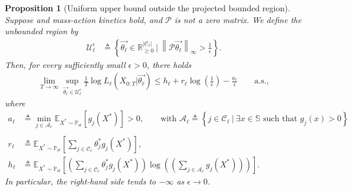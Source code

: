 \documentclass[pdflatex,sn-mathphys-num]{sn-jnl}%
\theoremstyle{thmstyleone}%
\newtheorem{proposition}[theorem]{Proposition}%
\theoremstyle{thmstyletwo}%
\theoremstyle{thmstylethree}%
\begin{document}
\begin{appendices}
\begin{proposition}[Uniform upper bound outside the projected bounded region]\label{proposition uniform upper bound outside bounded region}
    Suppose  and mass-action kinetics hold, and $\mathcal P$ is not a zero matrix.
    We define the unbounded region by
    \begin{align*}
        \mathcal U_\ell^\epsilon
        &\triangleq
        \left\{\overrightarrow{\theta_\ell}
        \in\mathbb R_{\geq0}^{|\mathcal C_\ell|}~\Big|~
        \left\|\mathcal P\overrightarrow{\theta_\ell}\right\|_\infty
        >\frac{1}{\epsilon}
        \right\}.
    \end{align*}
    Then, for every sufficiently small $\epsilon>0$, there holds
    \begin{align}\label{eq upper bound outside bounded region}
        \lim_{T\to\infty}
        \sup_{\overrightarrow{\theta_\ell}\in\mathcal U_\ell^\epsilon}
        \frac{1}{T}\log L_\ell\left(X_{0:T}\big|\overrightarrow{\theta_\ell}\right)
        \leq
        h_\ell
        + r_\ell\log\left(\frac{1}{\epsilon}\right)
        -\frac{a_\ell}{\epsilon}
        \qquad \text{a.s.},
    \end{align}
    where
    \begin{align*}
        a_\ell
        &\triangleq
        \min_{j\in\mathcal A_\ell}
        \mathbb E_{X^*\sim\mathbb P_\text{st}}\left[g_j(X^*)\right] >0,
        \qquad \text{with $\mathcal A_\ell
        \triangleq
        \left\{j\in\mathcal C_\ell~\Big|~
        \exists x\in\mathbb S \text{ such that } g_j(x)>0
        \right\}$} \\
        \\
        r_\ell
        &\triangleq
        \mathbb E_{X^*\sim\mathbb P_\text{st}}\left[
        \sum_{j\in\mathcal C_\ell}\theta_j^*g_j(X^*)
        \right],\\
        h_\ell
        &\triangleq
        \mathbb E_{X^*\sim\mathbb P_\text{st}}\left[
        \left(\sum_{j\in\mathcal C_\ell}\theta_j^*g_j(X^*)\right)
        \log\left(\left(\sum_{j\in\mathcal A_\ell}g_j(X^*)\right)\right)
        \right].
    \end{align*}
    In particular, the right-hand side tends to $-\infty$ as $\epsilon\to 0$.
\end{proposition}


\end{appendices}
\end{document}
